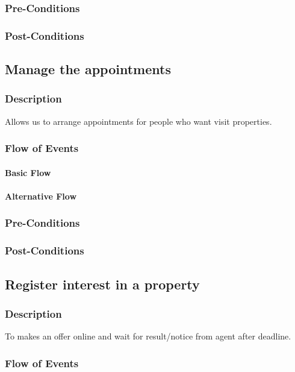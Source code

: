 \documentclass[a4paper,12pt]{article}
\begin{document}
\subsubsection{Pre-Conditions}
\subsubsection{Post-Conditions}

\subsection{Manage the appointments}
\subsubsection{Description}
Allows us to arrange appointments for people who want visit properties.
\subsubsection{Flow of Events}
\paragraph{Basic Flow}
\begin{itemize}
\end{itemize}
\paragraph{Alternative Flow}
\begin{itemize}
\end{itemize}
\subsubsection{Pre-Conditions}
\subsubsection{Post-Conditions}

\subsection{Register interest in a property}
\subsubsection{Description}
To makes an offer online and wait for result/notice from agent after deadline.
\subsubsection{Flow of Events}
\end{document}
